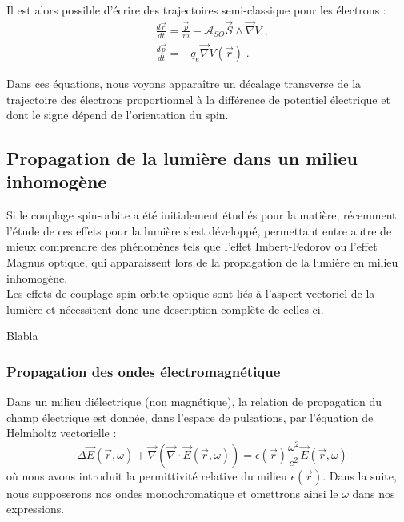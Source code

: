 \documentclass[a4paper,11pt]{article} %
\newenvironment{encart}[1]{%
	\begin{tcolorbox}
		[
		breakable, enhanced jigsaw, %
		arc = 1mm, %
		title = \textbf{#1}, %
		coltitle = white, %
		colbacktitle = blue, %
		colback = white, %
		colframe = blue %
		]
}{		
	\end{tcolorbox}
}
\begin{document}
	Il est alors possible d'écrire des trajectoires semi-classique pour les électrons :
	\begin{align}
		& \frac{d\vec{r}}{dt} = \frac{\vec{p}}{m} - \mathcal{A}_{SO} \vec{S} \wedge \vec{\nabla} V \; , \label{eq_mvt_SHE_r} \\
		& \frac{d \vec{p}}{dt} = - q_e \vec{\nabla} V(\vec{r}) \; . \label{eq_mvt_SHE_p}
	\end{align}

	Dans ces équations, nous voyons apparaître un décalage transverse de la trajectoire des électrons proportionnel à la différence de potentiel électrique et dont le signe dépend de l'orientation du spin.
	
	
	\subsection{Propagation de la lumière dans un milieu inhomogène}
	Si le couplage spin-orbite a été initialement étudiés pour la matière, récemment l'étude de ces effets pour la lumière s'est développé, permettant entre autre de mieux comprendre des phénomènes tels que l'effet Imbert-Fedorov ou l'effet Magnus optique, qui apparaissent lors de la propagation de la lumière en milieu inhomogène.\\
	
	Les effets de couplage spin-orbite optique sont liés à l'aspect vectoriel de la lumière et nécessitent donc une description complète de celles-ci. 
	
	
	\begin{encart}{Activité pédagogique : réflection de la lumière à une interface}
		Blabla
	\end{encart}
	
	\subsubsection{Propagation des ondes électromagnétique}
	Dans un milieu diélectrique (non magnétique), la relation de propagation du champ électrique est donnée, dans l'espace de pulsations, par l'équation de Helmholtz vectorielle :
	\begin{equation*}
		\label{eq_Helmholtz_vect}
		- \varDelta \vec{E}(\vec{r}, \omega) + \vec{\nabla}(\vec{\nabla}\cdot \vec{E}(\vec{r}, \omega)) = \epsilon(\vec{r}) \frac{\omega^2}{c^2} \vec{E}(\vec{r}, \omega)
	\end{equation*}
	où nous avons introduit la permittivité relative du milieu $ \epsilon(\vec{r}) $. Dans la suite, nous supposerons nos ondes monochromatique et omettrons ainsi le $\omega$ dans nos expressions.\\
	
\end{document}
